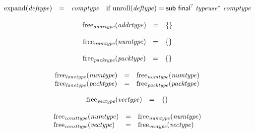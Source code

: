 $$
\begin{array}[t]{@{}lcl@{}l@{}}
{\mathrm{expand}}({\mathit{deftype}}) & = & {\mathit{comptype}} & \quad \mbox{if}~ {\mathrm{unroll}}({\mathit{deftype}}) = \mathsf{sub}~{\mathsf{final}^?}~{{\mathit{typeuse}}^\ast}~{\mathit{comptype}} \\
\end{array}
$$

\vspace{1ex}

\vspace{1ex}

$$
\begin{array}[t]{@{}lcl@{}l@{}}
{\mathrm{free}}_{\mathit{addrtype}}({\mathit{addrtype}}) & = & \{  \} \\
\end{array}
$$

$$
\begin{array}[t]{@{}lcl@{}l@{}}
{\mathrm{free}}_{\mathit{numtype}}({\mathit{numtype}}) & = & \{  \} \\
\end{array}
$$

$$
\begin{array}[t]{@{}lcl@{}l@{}}
{\mathrm{free}}_{\mathit{packtype}}({\mathit{packtype}}) & = & \{  \} \\
\end{array}
$$

$$
\begin{array}[t]{@{}lcl@{}l@{}}
{\mathrm{free}}_{\mathit{lanetype}}({\mathit{numtype}}) & = & {\mathrm{free}}_{\mathit{numtype}}({\mathit{numtype}}) \\
{\mathrm{free}}_{\mathit{lanetype}}({\mathit{packtype}}) & = & {\mathrm{free}}_{\mathit{packtype}}({\mathit{packtype}}) \\
\end{array}
$$

$$
\begin{array}[t]{@{}lcl@{}l@{}}
{\mathrm{free}}_{\mathit{vectype}}({\mathit{vectype}}) & = & \{  \} \\
\end{array}
$$

$$
\begin{array}[t]{@{}lcl@{}l@{}}
{\mathrm{free}}_{\mathit{consttype}}({\mathit{numtype}}) & = & {\mathrm{free}}_{\mathit{numtype}}({\mathit{numtype}}) \\
{\mathrm{free}}_{\mathit{consttype}}({\mathit{vectype}}) & = & {\mathrm{free}}_{\mathit{vectype}}({\mathit{vectype}}) \\
\end{array}
$$

